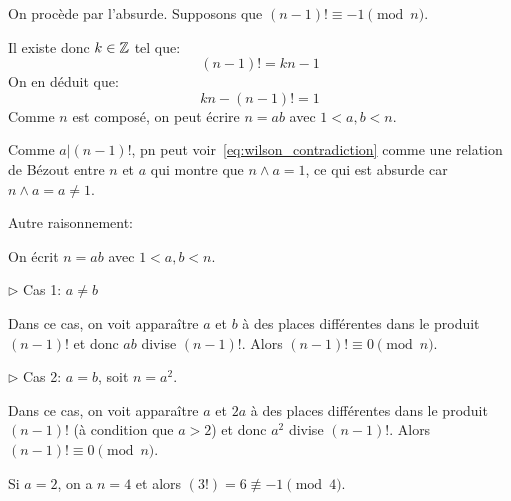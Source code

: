 {\begin{td-sol}[]
\begin{enumerate}
            On procède par l'absurde. Supposons que \((n-1)!\equiv -1 \pmod{n}\).

            Il existe donc \(k\in\mathbb{Z}\) tel que:
            \begin{equation*}
                (n-1)! = kn - 1
            \end{equation*}
            On en déduit que:
            \begin{equation}
                kn - (n-1)! = 1 \label{eq:wilson_contradiction}
            \end{equation}
            Comme \(n\) est composé, on peut écrire \(n=ab\) avec
            \(1<a,b<n\).

            Comme \(a | (n-1)!\), pn peut voir~\eqref{eq:wilson_contradiction} comme
            une relation de Bézout entre \(n\) et \(a\) qui montre que
            \(n\wedge a = 1\), ce qui est absurde car \(n\wedge a=a\neq 1\).

            Autre raisonnement:
            
            On écrit \(n=ab\) avec \(1<a,b<n\).

            \(\triangleright\) Cas 1: \(a\neq b\)

            Dans ce cas, on voit apparaître \(a\) et \(b\) à
            des places différentes dans le produit \((n-1)!\) et donc
            \(ab\) divise \((n-1)!\). Alors \((n-1)!\equiv 0\pmod{n}\).

            \(\triangleright\) Cas 2: \(a=b\), soit \(n=a^2\).

            Dans ce cas, on voit apparaître \(a\) et \(2a\) à
            des places différentes dans le produit \((n-1)!\) (à
            condition que \(a>2\)) et donc \(a^2\) divise \((n-1)!\).
            Alors \((n-1)!\equiv 0\pmod{n}\).

            Si \(a=2\), on a \(n=4\) et alors \((3!)=6\not\equiv -1\pmod{4}\).
            
        \end{enumerate}
    \end{td-sol}
}{}

